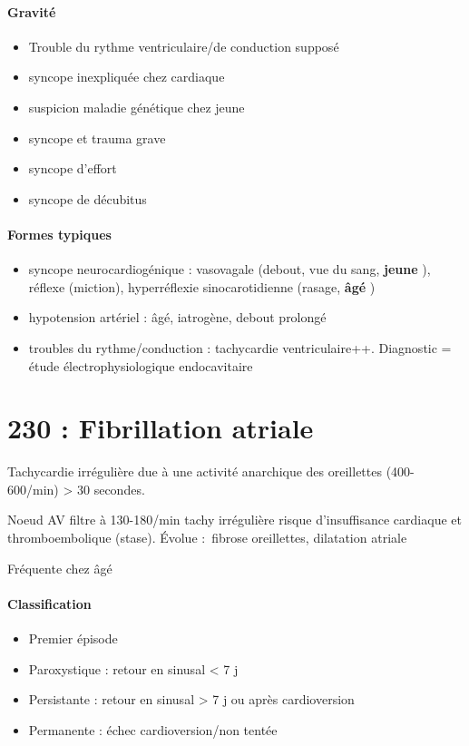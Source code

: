 \documentclass{article}
\begin{document}
\paragraph{Gravité}
\begin{itemize}
  \item Trouble du rythme ventriculaire/de conduction supposé
  \item syncope inexpliquée chez cardiaque
  \item suspicion maladie génétique chez jeune
  \item syncope et trauma grave
  \item syncope d'effort
  \item syncope de décubitus
\end{itemize}

\paragraph{Formes typiques}
\begin{itemize}
  \item syncope neurocardiogénique : vasovagale (debout, vue du sang,
    \textbf{jeune} ), réflexe
    (miction), hyperréflexie sinocarotidienne (rasage, \textbf{âgé} )
  \item hypotension artériel : âgé, iatrogène, debout prolongé
  \item troubles du rythme/conduction : tachycardie
    ventriculaire++. Diagnostic = étude électrophysiologique endocavitaire
\end{itemize}

\section{230 : Fibrillation atriale}%
\label{sec:230_fibrillation_atriale}

Tachycardie irrégulière due à une activité anarchique des oreillettes
(400-600/min) > 30 secondes.

Noeud AV filtre à 130-180/min \thus tachy irrégulière \thus risque
d'insuffisance cardiaque et thromboembolique (stase). Évolue : fibrose
oreillettes, dilatation atriale

Fréquente chez âgé

\paragraph{Classification}
\begin{itemize}
  \item Premier épisode
  \item Paroxystique : retour en sinusal < 7 j
  \item Persistante :  retour en sinusal > 7 j ou après cardioversion
  \item Permanente : échec cardioversion/non tentée
\end{itemize}
\end{document}
